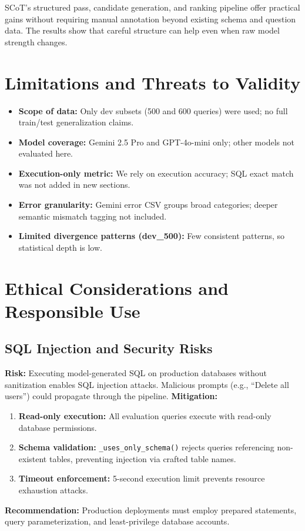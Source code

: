 \documentclass[12pt,a4paper]{report}
\begin{document}
SCoT’s structured pass, candidate generation, and ranking pipeline offer practical gains without requiring manual annotation beyond existing schema and question data. The results show that careful structure can help even when raw model strength changes.
\section{Limitations and Threats to Validity}
\begin{itemize}
  \item \textbf{Scope of data:} Only dev subsets (500 and 600 queries) were used; no full train/test generalization claims.
  \item \textbf{Model coverage:} Gemini 2.5 Pro and GPT-4o-mini only; other models not evaluated here.
  \item \textbf{Execution-only metric:} We rely on execution accuracy; SQL exact match was not added in new sections.
  \item \textbf{Error granularity:} Gemini error CSV groups broad categories; deeper semantic mismatch tagging not included.
  \item \textbf{Limited divergence patterns (dev_500):} Few consistent patterns, so statistical depth is low.
\end{itemize}
\section{Ethical Considerations and Responsible Use}
\subsection{SQL Injection and Security Risks}
\textbf{Risk:} Executing model-generated SQL on production databases without sanitization enables SQL injection attacks. Malicious prompts (e.g., ``Delete all users'') could propagate through the pipeline.
\textbf{Mitigation:}
\begin{enumerate}
  \item \textbf{Read-only execution:} All evaluation queries execute with read-only database permissions.
  \item \textbf{Schema validation:} \texttt{\_uses\_only\_schema()} rejects queries referencing non-existent tables, preventing injection via crafted table names.
  \item \textbf{Timeout enforcement:} 5-second execution limit prevents resource exhaustion attacks.
\end{enumerate}
\textbf{Recommendation:} Production deployments must employ prepared statements, query parameterization, and least-privilege database accounts.
\end{document}
